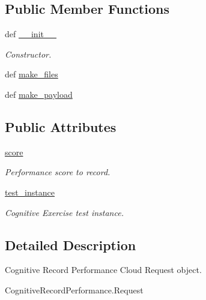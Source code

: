 \subsection*{Public Member Functions}
\begin{DoxyCompactItemize}
\item 
def \hyperlink{classRappCloud_1_1CloudMsgs_1_1CognitiveRecordPerformance_1_1CognitiveRecordPerformance_1_1Request_a72fc10e78c8781905cbe9cb417681340}{\-\_\-\-\_\-init\-\_\-\-\_\-}
\begin{DoxyCompactList}\small\item\em Constructor. \end{DoxyCompactList}\item 
def \hyperlink{classRappCloud_1_1CloudMsgs_1_1CognitiveRecordPerformance_1_1CognitiveRecordPerformance_1_1Request_adcf7f71d0016240605913a883df99b18}{make\-\_\-files}
\item 
def \hyperlink{classRappCloud_1_1CloudMsgs_1_1CognitiveRecordPerformance_1_1CognitiveRecordPerformance_1_1Request_ae9f1e561beae71985ef52adb6b10c40d}{make\-\_\-payload}
\end{DoxyCompactItemize}
\subsection*{Public Attributes}
\begin{DoxyCompactItemize}
\item 
\hyperlink{classRappCloud_1_1CloudMsgs_1_1CognitiveRecordPerformance_1_1CognitiveRecordPerformance_1_1Request_a00caf4eda9ff3911404c5ff182fd0593}{score}
\begin{DoxyCompactList}\small\item\em Performance score to record. \end{DoxyCompactList}\item 
\hyperlink{classRappCloud_1_1CloudMsgs_1_1CognitiveRecordPerformance_1_1CognitiveRecordPerformance_1_1Request_ae0fde166148135cc8fea9aebe782c174}{test\-\_\-instance}
\begin{DoxyCompactList}\small\item\em Cognitive Exercise test instance. \end{DoxyCompactList}\end{DoxyCompactItemize}


\subsection{Detailed Description}
\begin{DoxyVerb}Cognitive Record Performance Cloud Request object.

CognitiveRecordPerformance.Request
\end{DoxyVerb}
 

